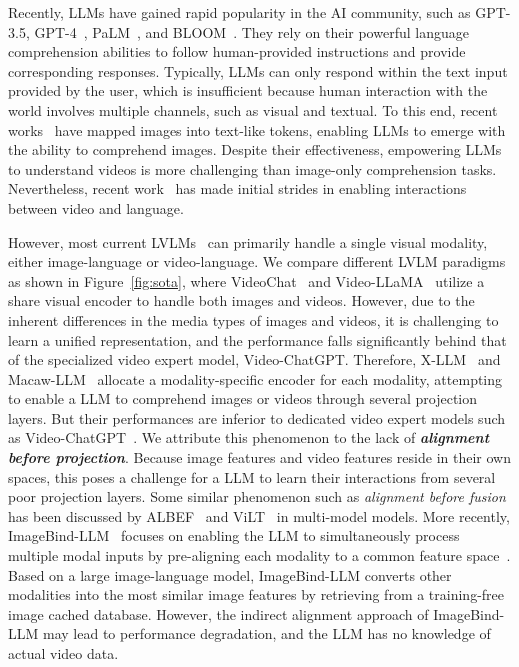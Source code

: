 Recently, LLMs have gained rapid popularity in the AI community, such as GPT-3.5, GPT-4~\cite{openai2023gpt4}, PaLM~\cite{bi2020palm,anil2023palm}, and BLOOM~\cite{scao2022bloom}. They rely on their powerful language comprehension abilities to follow human-provided instructions and provide corresponding responses. Typically, LLMs can only respond within the text input provided by the user, which is insufficient because human interaction with the world involves multiple channels, such as visual and textual. To this end, recent works~\cite{ye2023mplug,zhu2023minigpt,alayrac2022flamingo} have mapped images into text-like tokens, enabling LLMs to emerge with the ability to comprehend images. Despite their effectiveness, empowering LLMs to understand videos is more challenging than image-only comprehension tasks. Nevertheless, recent work~\cite{maaz2023video,li2023videochat,zhang2023video} has made initial strides in enabling interactions between video and language.

However, most current LVLMs~\cite{li2023blip,dai2023instructblip,luo2023valley,li2023otter,yin2023survey,fu2023mme} can primarily handle a single visual modality, either image-language or video-language. We compare different LVLM paradigms as shown in Figure~\ref{fig:sota}, where VideoChat~\cite{li2023videochat} and Video-LLaMA~\cite{zhang2023video} utilize a share visual encoder to handle both images and videos. However, due to the inherent differences in the media types of images and videos, it is challenging to learn a unified representation, and the performance falls significantly behind that of the specialized video expert model, Video-ChatGPT. Therefore, X-LLM~\cite{chen2023x} and Macaw-LLM~\cite{lyu2023macaw} allocate a modality-specific encoder for each modality, attempting to enable a LLM to comprehend images or videos through several projection layers. But their performances are inferior to dedicated video expert models such as Video-ChatGPT~\cite{maaz2023video}. We attribute this phenomenon to the lack of \textit{\textbf{alignment before projection}}. Because image features and video features reside in their own spaces, this poses a challenge for a LLM to learn their interactions from several poor projection layers. Some similar phenomenon such as \textit{alignment before fusion} has been discussed by ALBEF~\cite{li2021align} and ViLT~\cite{kim2021vilt} in multi-model models. More recently, ImageBind-LLM~\cite{han2023imagebind} focuses on enabling the LLM to simultaneously process multiple modal inputs by pre-aligning each modality to a common feature space~\cite{girdhar2023imagebind}. Based on a large image-language model, ImageBind-LLM converts other modalities into the most similar image features by retrieving from a training-free image cached database. However, the indirect alignment approach of ImageBind-LLM may lead to performance degradation, and the LLM has no knowledge of actual video data.

